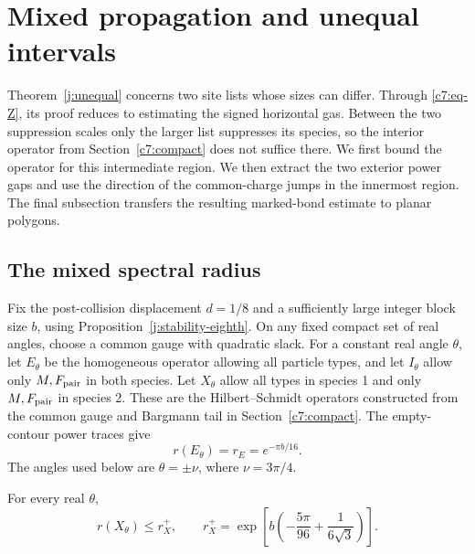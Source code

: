\section{Mixed propagation and unequal intervals}\label{c7:mixed}

Theorem~\ref{j:unequal} concerns two site lists whose sizes can differ.
Through \eqref{c7:eq-Z}, its proof reduces to estimating the signed
horizontal gas. Between the two suppression scales only the larger
list suppresses its species, so the interior operator from
Section~\ref{c7:compact} does not suffice there. We first bound the
operator for this intermediate region. We then extract the two exterior
power gaps and use the direction of the common-charge jumps in the
innermost region. The final subsection transfers the resulting
marked-bond estimate to planar polygons.

\subsection{The mixed spectral radius}

Fix the post-collision displacement $d=1/8$ and a sufficiently large
integer block size $b$, using Proposition~\ref{j:stability-eighth}.
On any fixed compact set of real angles, choose a common gauge with
quadratic slack.
For a constant real angle $\theta$, let $E_\theta$ be the homogeneous
operator allowing all particle types, and let $I_\theta$ allow only
$M,F_{\rm pair}$ in both species. Let $X_\theta$ allow all types in
species 1 and only $M,F_{\rm pair}$ in species 2. These are the
Hilbert--Schmidt operators constructed from the common gauge and
Bargmann tail in Section~\ref{c7:compact}. The empty-contour power
traces give
\[
 r(E_\theta)=r_E=e^{-\pi b/16}.
\]
The angles used below are $\theta=\pm\nu$, where $\nu=3\pi/4$.

\begin{proposition}\label{c7:mixed-radius}
For every real $\theta$,
\begin{equation}\label{c7:eq-X}
 r(X_\theta)\le r_X^+,
 \qquad r_X^+=\exp\!\left[b\left(-\frac{5\pi}{96}
                              +\frac1{6\sqrt3}\right)\right].
\end{equation}
\end{proposition}

